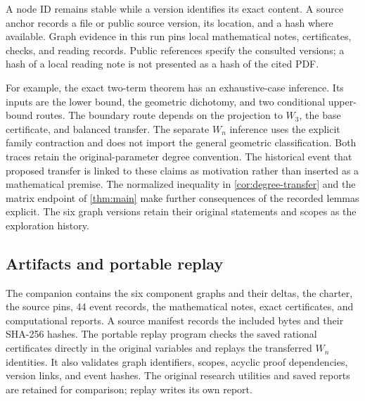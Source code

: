A node ID remains stable while a version identifies its exact content. A source anchor records a file or public source version, its location, and a hash where available. Graph evidence in this run pins local mathematical notes, certificates, checks, and reading records. Public references specify the consulted versions; a hash of a local reading note is not presented as a hash of the cited PDF.

For example, the exact two-term theorem has an exhaustive-case inference. Its inputs are the lower bound, the geometric dichotomy, and two conditional upper-bound routes. The boundary route depends on the projection to $W_3$, the base certificate, and balanced transfer. The separate $W_n$ inference uses the explicit family contraction and does not import the general geometric classification. Both traces retain the original-parameter degree convention. The historical event that proposed transfer is linked to these claims as motivation rather than inserted as a mathematical premise. The normalized inequality in \cref{cor:degree-transfer} and the matrix endpoint of \cref{thm:main} make further consequences of the recorded lemmas explicit. The six graph versions retain their original statements and scopes as the exploration history.

\subsection{Artifacts and portable replay}

The companion contains the six component graphs and their deltas, the charter, the source pins, 44 event records, the mathematical notes, exact certificates, and computational reports. A source manifest records the included bytes and their SHA-256 hashes. The portable replay program checks the saved rational certificates directly in the original variables and replays the transferred $W_n$ identities. It also validates graph identifiers, scopes, acyclic proof dependencies, version links, and event hashes. The original research utilities and saved reports are retained for comparison; replay writes its own report.

